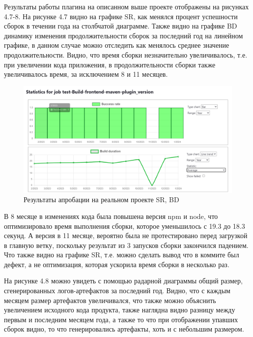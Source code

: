 Результаты работы плагина на описанном выше проекте отображены на рисунках 4.7-8. На рисунке 4.7 видно на графике SR, как менялся процент успешности сборок в течении года на столбчатой диаграмме. Также видно на графике BD динамику изменения продолжительности сборок за последний год на линейном графике, в данном случае можно отследить как менялось среднее значение продолжительности. Видно, что время сборки незначительно увеличивалось, т.е. при увеличении кода приложения, в продолжительности сборки также увеличивалось время, за исключением 8 и 11 месяцев. 


 \begin{figure}[ht!] 
	\center
	\includegraphics [scale=0.47] {my_folder/images//reares1}
	\caption{Результаты апробации на реальном проекте SR, BD} 
	\label{fig:reares1}  
\end{figure}

В 8 месяце в изменениях кода была повышена версия npm и node, что оптимизировало время выполнения сборки, которое уменьшилось с 19.3 до 18.3 секунд. А версия в 11 месяце, вероятно была не протестировано перед загрузкой в главную ветку, поскольку результат из 3 запусков сборки закончился падением. Что также видно на графике SR, т.е. можно сделать вывод что в коммите был дефект, а не оптимизация, которая ускорила время сборки в несколько раз.

На рисунке 4.8 можно увидеть с помощью радарной диаграммы общий размер, сгенерированных логов-артефактов за последний год. Видно, что с каждым месяцем размер артефактов увеличивался, что также можно объяснить увеличением исходного кода продукта, также наглядна видно разницу между первым и последним месяцем года, а также то что при отображении упавших сборок видно, то что генерировались артефакты, хоть и с небольшим размером.

